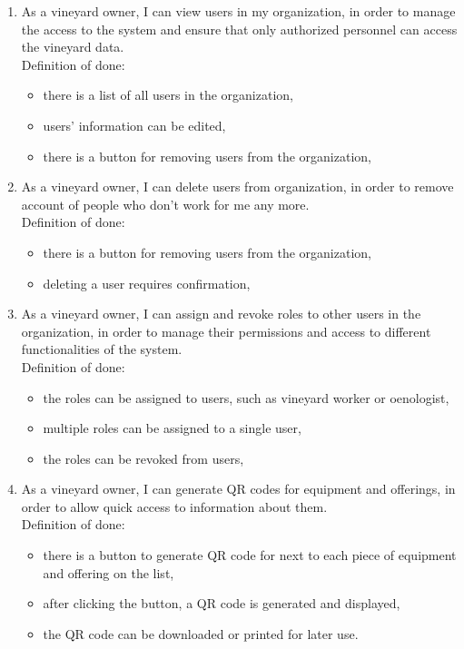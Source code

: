 \begin{enumerate}
	\item As a vineyard owner, I can view users in my organization, in order to manage the access to the system and ensure that only authorized personnel can access the vineyard data.
	\\Definition of done:
	\begin{itemize}
		\item there is a list of all users in the organization,
		\item users' information can be edited,
		\item there is a button for removing users from the organization,
	\end{itemize}
	\item As a vineyard owner, I can delete users from organization, in order to remove account of people who don't work for me any more.
	\\Definition of done:
	\begin{itemize}
		\item there is a button for removing users from the organization,
		\item deleting a user requires confirmation,
	\end{itemize}
	
	\item As a vineyard owner, I can assign and revoke roles to other users in the organization, in order to manage their permissions and access to different functionalities of the system.
	\\Definition of done:
	\begin{itemize}
		\item the roles can be assigned to users, such as vineyard worker or oenologist,
		\item multiple roles can be assigned to a single user,
		\item the roles can be revoked from users,
	\end{itemize}
	
	\item As a vineyard owner, I can generate QR codes for equipment and offerings, in order to allow quick access to information about them.
	\\Definition of done:
	\begin{itemize}
		\item there is a button to generate QR code for next to each piece of equipment and offering on the list,
		\item after clicking the button, a QR code is generated and displayed,
		\item the QR code can be downloaded or printed for later use.
	\end{itemize}

\end{enumerate}
